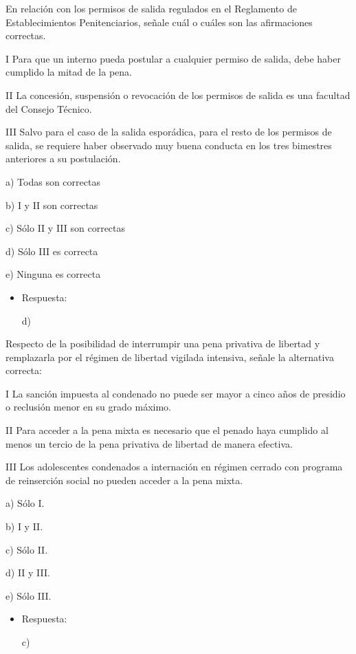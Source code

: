\documentclass[letterpaper, 11pt]{article}
\begin{document}
En relación con los permisos de salida regulados en el Reglamento de
Establecimientos Penitenciarios, señale cuál o cuáles son las
afirmaciones correctas.

I Para que un interno pueda postular a cualquier permiso de salida,
debe haber cumplido la mitad de la pena.

II La concesión, suspensión o revocación de los permisos de salida es
una facultad del Consejo Técnico.

III Salvo para el caso de la salida esporádica, para el resto de los
permisos de salida, se requiere haber observado muy buena conducta en
los tres bimestres anteriores a su postulación.

a) Todas son correctas

b) I y II son correctas

c) Sólo II y III son correctas

d) Sólo III es correcta

e) Ninguna es correcta

\begin{itemize}
\item Respuesta:

d)
\end{itemize}


Respecto de la posibilidad de interrumpir una pena privativa de
libertad y remplazarla por el régimen de libertad vigilada intensiva,
señale la alternativa correcta:


I La sanción impuesta al condenado no puede ser mayor a cinco años de
presidio o reclusión menor en su grado máximo.

II Para acceder a la pena mixta es necesario que el penado haya
cumplido al menos un tercio de la pena privativa de libertad de manera
efectiva.

III Los adolescentes condenados a internación en régimen cerrado con
programa de reinserción social no pueden acceder a la pena mixta.


a) Sólo I.


b) I y II.



c) Sólo II.


d) II y III.



e) Sólo III.


\begin{itemize}
\item Respuesta:

c)
\end{itemize}
\end{document}
